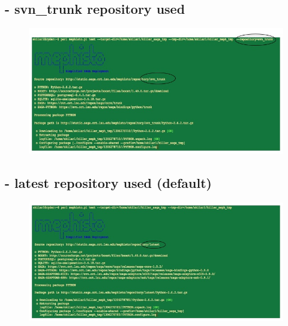 \documentclass[a4paper,10pt]{article}
\begin{document}
\subsection*{- svn\_trunk repository used}
\begin{figure}[H]
\begin{center}
\includegraphics[scale=0.60]{svntrunk.jpg}
\end{center}
\end{figure}
\subsection*{- latest repository used (default)}
\begin{figure}[H]
\begin{center}
\includegraphics[scale=0.60]{latest.jpg}
\end{center}
\end{figure}
\end{document}
